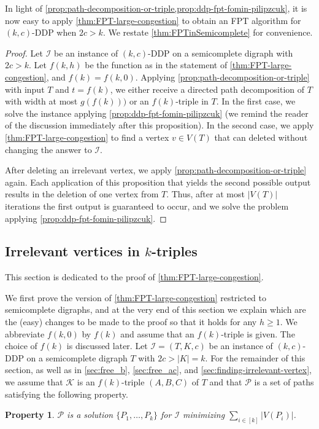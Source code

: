 \documentclass[a4paper,UKenglish,cleveref, autoref, thm-restate]{lipics-v2021}
\newtheorem{property}[theorem]{Property}
\renewcommand{\FPT}{{\sf FPT}\xspace}
\begin{document}
In light of \cref{prop:path-decomposition-or-triple,prop:ddp-fpt-fomin-pilipzcuk}, it is now easy to apply \autoref{thm:FPT-large-congestion} to obtain an \FPT algorithm for $(k,c)$-\textsc{DDP} when $2c > k$.
We restate \autoref{thm:FPTinSemicomplete} for convenience.

\FPTinSemicomplete* 

\begin{proof}
Let $\mathcal{I}$ be an instance of $(k,c)$-\textsc{DDP} on a semicomplete digraph with $2c > k$.
Let $f(k,h)$ be the function as in the statement of \autoref{thm:FPT-large-congestion}, and $f(k) = f(k, 0)$.
Applying \autoref{prop:path-decomposition-or-triple} with input $T$ and $t = f(k)$, we either receive a directed path decomposition of $T$ with width at most $g(f(k)))$  or an $f(k)$-triple in $T$.
In the first case, we solve the instance applying \autoref{prop:ddp-fpt-fomin-pilipzcuk} (we remind the reader of the discussion immediately after this proposition).
In the second case, we apply \autoref{thm:FPT-large-congestion} to find a vertex $v \in V(T)$ that can deleted without changing the answer to $\mathcal{I}$.

After deleting an irrelevant vertex, we apply \autoref{prop:path-decomposition-or-triple} again.
Each application of this proposition that yields the second possible output results in the deletion of one vertex from $T$.
Thus, after at most $|V(T)|$ iterations the first output is guaranteed to occur, and we solve the problem applying \autoref{prop:ddp-fpt-fomin-pilipzcuk}.
\end{proof}

\subsection{Irrelevant vertices in
\texorpdfstring{$k$}{k}-triples}\label{sec:irrelevant-vertex-in-triples}
This section is dedicated to the proof of \autoref{thm:FPT-large-congestion}.

We first prove the version of \autoref{thm:FPT-large-congestion} restricted to semicomplete digraphs, and at the very end of this section we explain which are the (easy) changes to be made to the proof so that it holds for any $h \geq 1$. We abbreviate $f(k,0)$ by $f(k)$ and assume
that an $f(k)$-triple is given.
The choice of $f(k)$ is discussed later.
Let $\mathcal{I} = (T, K, c)$ be an instance of $(k,c)$-\textsc{DDP} on a
semicomplete digraph $T$ with $2c > |K| = k$.
For the remainder of this section, as well as in \autoref{sec:free_b}, \autoref{sec:free_ac}, and \autoref{sec:finding-irrelevant-vertex}, we assume that $\mathcal{K}$ is an
$f(k)$-triple $(A,B,C)$ of $T$ and that $\mathcal{P}$ is a set of paths satisfying the
following property.
\begin{property}
  \label{prop:minimizing-for-solution}
  $\mathcal{P}$ is a solution $\{P_1, \ldots, P_k\}$ for $\mathcal{I}$ minimizing
  $\sum_{i \in [k]}|V(P_i)|$.
\end{property}
\end{document}
